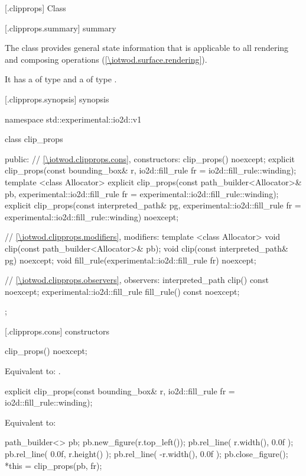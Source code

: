 
 [\iotwod.clipprops] {Class }

 [\iotwod.clipprops.summary] { summary}

\pnum
The  class provides general state information that is applicable to all rendering and composing operations (\ref{\iotwod.surface.rendering}).

\pnum
It has a  of type  and a  of type .

 [\iotwod.clipprops.synopsis] { synopsis}

\begin{codeblock}
namespace std::experimental::io2d::v1 {
  class clip_props {
  public:
    // \ref{\iotwod.clipprops.cons}, constructors:
    clip_props() noexcept;
    explicit clip_props(const bounding_box& r,
      io2d::fill_rule fr = io2d::fill_rule::winding);
    template <class Allocator>
    explicit clip_props(const path_builder<Allocator>& pb,
      experimental::io2d::fill_rule fr = 
      experimental::io2d::fill_rule::winding);
    explicit clip_props(const interpreted_path& pg, experimental::io2d::fill_rule fr =
      experimental::io2d::fill_rule::winding) noexcept;

    // \ref{\iotwod.clipprops.modifiers}, modifiers:
    template <class Allocator>
    void clip(const path_builder<Allocator>& pb);
    void clip(const interpreted_path& pg) noexcept;
    void fill_rule(experimental::io2d::fill_rule fr) noexcept;
    
    // \ref{\iotwod.clipprops.observers}, observers:
    interpreted_path clip() const noexcept;
    experimental::io2d::fill_rule fill_rule() const noexcept;
  };
}
\end{codeblock}

 [\iotwod.clipprops.cons] { constructors}

%
\begin{itemdecl}
clip_props() noexcept;
\end{itemdecl}
\begin{itemdescr}
\pnum
\effects
Equivalent to: .
\end{itemdescr}

%
\begin{itemdecl}
explicit clip_props(const bounding_box& r,
  io2d::fill_rule fr = io2d::fill_rule::winding);
\end{itemdecl}
\begin{itemdescr}
\pnum
\effects
Equivalent to:
\begin{codeblock}
path_builder<> pb;
pb.new_figure(r.top_left());
pb.rel_line({ r.width(), 0.0f });
pb.rel_line({ 0.0f, r.height() });
pb.rel_line({ -r.width(), 0.0f });
pb.close_figure();
*this = clip_props(pb, fr);
\end{codeblock}
\end{itemdescr}

